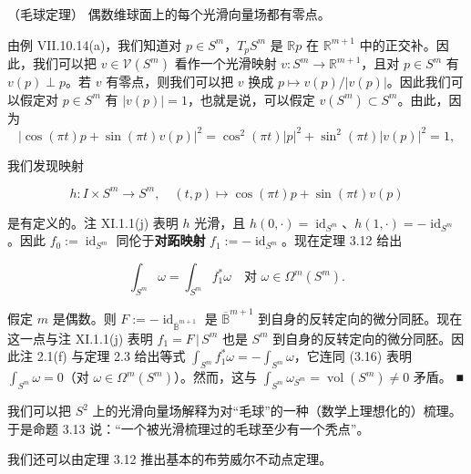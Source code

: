 \begin{proposition}

（毛球定理） 偶数维球面上的每个光滑向量场都有零点。

\proofhead
由例 VII.10.14(a)，我们知道对 $ p\in S^m $，$ T_p S^m $ 是 $ \mathbb{R}p $ 在 $ \mathbb{R}^{m+1} $ 中的正交补。因此，我们可以把 $ v\in\mathcal{V}(S^m) $ 看作一个光滑映射 $ v: S^m\to\mathbb{R}^{m+1} $，且对 $ p\in S^m $ 有 $ v(p)\perp p $。若 $ v $ 有零点，则我们可以把 $ v $ 换成 $ p\mapsto v(p)/|v(p)| $。因此我们可以假定对 $ p\in S^m $ 有 $ |v(p)| = 1 $，也就是说，可以假定 $ v(S^m)\subset S^m $。由此，因为
\[
|\cos(\pi t)p + \sin(\pi t)v(p)|^2 = \cos^2(\pi t)|p|^2 + \sin^2(\pi t)|v(p)|^2 = 1,
\]

我们发现映射

\[
h : I\times S^m\to S^m,\quad (t,p)\mapsto\cos(\pi t)p + \sin(\pi t)v(p)
\]

是有定义的。注 XI.1.1(j) 表明 $ h $ 光滑，且 $ h(0,\cdot) = \operatorname{id}_{S^m} $、$ h(1,\cdot) = -\operatorname{id}_{S^m} $。因此 $ f_0 := \operatorname{id}_{S^m} $ 同伦于\textbf{对跖映射} $ f_1 := -\operatorname{id}_{S^m} $。现在定理 3.12 给出

\begin{equation}
\int_{S^m}\omega = \int_{S^m}f_1^*\omega \quad \text{对 } \omega\in\Omega^m(S^m) .\tag{3.16}
\end{equation}

假定 $ m $ 是偶数。则 $ F := -\operatorname{id}_{\overline{\mathbb{B}}^{m+1}} $ 是 $ \overline{\mathbb{B}}^{m+1} $ 到自身的反转定向的微分同胚。现在这一点与注 XI.1.1(j) 表明 $ f_1 = F\,|\,S^m $ 也是 $ S^m $ 到自身的反转定向的微分同胚。因此注 2.1(f) 与定理 2.3 给出等式 $ \int_{S^m}f_1^*\omega = -\int_{S^m}\omega $，它连同 (3.16) 表明 $ \int_{S^m}\omega = 0 $（对 $ \omega\in\Omega^m(S^m) $）。然而，这与 $ \int_{S^m}\omega_{S^m} = \operatorname{vol}(S^m)\neq 0 $ 矛盾。 \nobreak\hspace{0.35em}■

\end{proposition}

我们可以把 $ S^2 $ 上的光滑向量场解释为对“毛球”的一种（数学上理想化的）梳理。于是命题 3.13 说：“一个被光滑梳理过的毛球至少有一个秃点”。

我们还可以由定理 3.12 推出基本的布劳威尔不动点定理。

